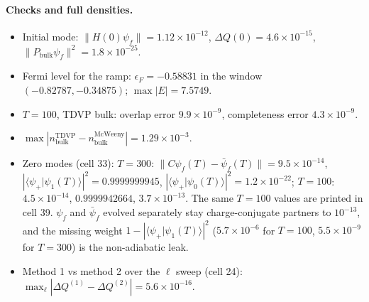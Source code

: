 \documentclass[11pt]{article}
\begin{document}
\paragraph{Checks and full densities.}
\begin{itemize}
\item Initial mode: $\lVert H(0)\psi_f\rVert=1.12\times10^{-12}$, $\Delta Q(0)=4.6\times10^{-15}$,
      $\lVert P_{\text{bulk}}\psi_f\rVert^2=1.8\times10^{-25}$.
\item Fermi level for the ramp: $\epsilon_F=-0.58831$ in the window $(-0.82787,-0.34875)$; $\max|E|=7.5749$.
\item $T=100$, TDVP bulk: overlap error $9.9\times10^{-9}$, completeness error $4.3\times10^{-9}$.
\item $\max|n_{\text{bulk}}^{\text{TDVP}}-n_{\text{bulk}}^{\text{McWeeny}}| = 1.29\times10^{-3}$.
\item Zero modes (cell 33): $T=300$: $\lVert C\psi_f(T)-\bar\psi_f(T)\rVert=9.5\times10^{-14}$,
      $|\langle\psi_+\vert\psi_1(T)\rangle|^2=0.9999999945$, $|\langle\psi_+\vert\psi_0(T)\rangle|^2=1.2\times10^{-22}$;
      $T=100$: $4.5\times10^{-14}$, $0.9999942664$, $3.7\times10^{-13}$. The same $T=100$ values are printed in cell 39.
      $\psi_f$ and $\bar\psi_f$ evolved separately stay charge-conjugate partners to $10^{-13}$, and the missing
      weight $1-|\langle\psi_+\vert\psi_1(T)\rangle|^2$ ($5.7\times10^{-6}$ for $T=100$, $5.5\times10^{-9}$ for $T=300$)
      is the non-adiabatic leak.
\item Method 1 vs method 2 over the $\ell$ sweep (cell 24): $\max_\ell|\Delta Q^{(1)}-\Delta Q^{(2)}|=5.6\times10^{-16}$.
\end{itemize}
\end{document}
